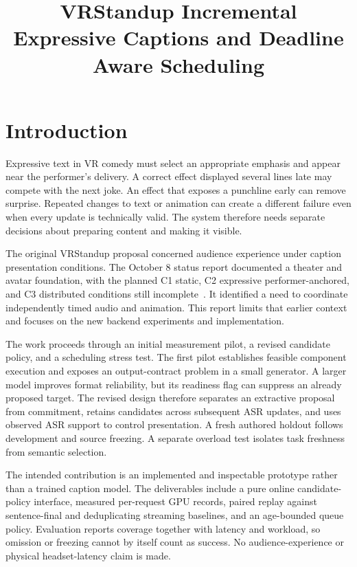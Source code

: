 \documentclass[conference,letterpaper]{IEEEtran}
\begin{document}
\title{VRStandup Incremental Expressive Captions and Deadline Aware Scheduling}
\author{}
\maketitle

\section{Introduction}
Expressive text in VR comedy must select an appropriate emphasis and appear near the performer's delivery. A correct effect displayed several lines late may compete with the next joke. An effect that exposes a punchline early can remove surprise. Repeated changes to text or animation can create a different failure even when every update is technically valid. The system therefore needs separate decisions about preparing content and making it visible.

The original VRStandup proposal concerned audience experience under caption presentation conditions. The October 8 status report documented a theater and avatar foundation, with the planned C1 static, C2 expressive performer-anchored, and C3 distributed conditions still incomplete~\cite{status}. It identified a need to coordinate independently timed audio and animation. This report limits that earlier context and focuses on the new backend experiments and implementation.

The work proceeds through an initial measurement pilot, a revised candidate policy, and a scheduling stress test. The first pilot establishes feasible component execution and exposes an output-contract problem in a small generator. A larger model improves format reliability, but its readiness flag can suppress an already proposed target. The revised design therefore separates an extractive proposal from commitment, retains candidates across subsequent ASR updates, and uses observed ASR support to control presentation. A fresh authored holdout follows development and source freezing. A separate overload test isolates task freshness from semantic selection.

The intended contribution is an implemented and inspectable prototype rather than a trained caption model. The deliverables include a pure online candidate-policy interface, measured per-request GPU records, paired replay against sentence-final and deduplicating streaming baselines, and an age-bounded queue policy. Evaluation reports coverage together with latency and workload, so omission or freezing cannot by itself count as success. No audience-experience or physical headset-latency claim is made.
\end{document}

